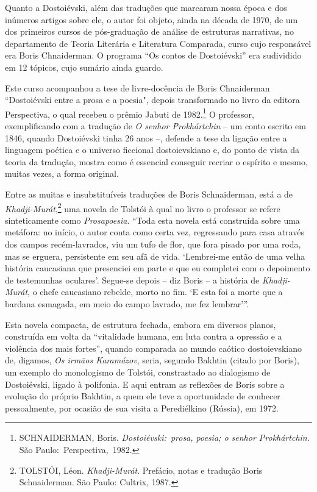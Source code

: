 Quanto a Dostoiévski, além das traduções que marcaram nossa época e dos
inúmeros artigos sobre ele, o autor foi objeto, ainda na década de 1970,
de um dos primeiros cursos de pós-graduação de análise de estruturas
narrativas, no departamento de Teoria Literária e Literatura Comparada,
curso cujo responsável era Boris Chnaiderman. O programa ``Os contos de
Dostoiévski'' era sudividido em 12 tópicos, cujo sumário ainda guardo.

Este curso acompanhou a tese de livre-docência de Boris Chnaiderman
``Dostoiévski entre a prosa e a poesia", depois transformado no livro da
editora Perspectiva, o qual recebeu o prêmio Jabuti de 1982.\footnote{SCHNAIDERMAN,
  Boris. \emph{Dostoiévski:~prosa, poesia; o senhor Prokhártchin}. São
  Paulo:~Perspectiva,~1982.} O professor, exemplificando com a tradução
de \emph{O senhor Prokhártchin} -- um conto escrito em 1846, quando
Dostoiévski tinha 26 anos --, defende a tese da ligação entre a
linguagem poética e o universo ficcional dostoievskiano e, do ponto de
vista da teoria da tradução, mostra como é essencial conseguir recriar o
espírito e mesmo, muitas vezes, a forma original.

Entre as muitas e insubstituíveis traduções de Boris Schnaiderman, está
a de \emph{Khadji-Murát},\footnote{TOLSTÓI, Léon. \emph{Khadji-Murát}.
  Prefácio, notas e tradução Boris Schnaiderman. São Paulo: Cultrix,
  1987.} uma novela de Tolstói à qual no livro o professor se refere
sinteticamente como \emph{Prosapoesia}. ``Toda esta novela está
construída sobre uma metáfora: no início, o autor conta como certa vez,
regressando para casa através dos campos recém-lavrados, viu um tufo de
flor, que fora pisado por uma roda, mas se erguera, persistente em seu
afã de vida. `Lembrei-me então de uma velha história caucasiana que
presenciei em parte e que eu completei com o depoimento de testemunhas
oculares'. Segue-se depois -- diz Boris -- a história de
\emph{Khadji-Murát}, o chefe caucasiano rebelde, morto no fim. `E esta
foi a morte que a bardana esmagada, em meio do campo lavrado, me fez
lembrar'''.

Esta novela compacta, de estrutura fechada, embora em diversos planos,
construída em volta da ``vitalidade humana, em luta contra a opressão e
a violência dos mais fortes'', quando comparada ao mundo caótico
dostoievskiano de, digamos, \emph{Os irmãos Karamázov}, seria, segundo
Bakhtin (citado por Boris), um exemplo do monologismo de Tolstói,
constrastado ao dialogismo de Dostoiévski, ligado à polifonia. E aqui
entram as reflexões de Boris sobre a evolução do próprio Bakhtin, a quem
ele teve a oportunidade de conhecer pessoalmente, por ocasião de sua
visita a Perediélkino (Rússia), em 1972.

